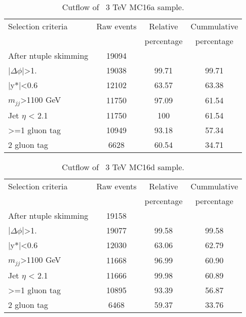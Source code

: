 \begin{table}[ht]
\begin{center}
\begin{tabular}{|l|c|c|c|}
\hline
Selection criteria & Raw events &  Relative & Cummulative \\
 & & percentage & percentage \\
\hline
After ntuple skimming & 19094 &  &  \\
$|\Delta\phi|$>1. & 19038 & 99.71 & 99.71 \\
|y*|<0.6 & 12102 & 63.57 & 63.38 \\
$m_{jj}$>1100 GeV & 11750 & 97.09 & 61.54 \\
Jet $\eta$ < 2.1 & 11750 & 100 & 61.54 \\
>=1 gluon tag & 10949 & 93.18 & 57.34 \\
2 gluon tag & 6628 & 60.54 & 34.71 \\
\hline
\end{tabular}
\end{center}
\caption{Cutflow of \Hprime\ 3 TeV MC16a sample.}
\end{table}

\begin{table}[ht]
\begin{center}
\begin{tabular}{|l|c|c|c|}
\hline
Selection criteria & Raw events &  Relative & Cummulative \\
 & & percentage & percentage \\
\hline
After ntuple skimming & 19158 &  &  \\
$|\Delta\phi|$>1. & 19077 & 99.58 & 99.58 \\
|y*|<0.6 & 12030 & 63.06 & 62.79 \\
$m_{jj}$>1100 GeV & 11668 & 96.99 & 60.90 \\
Jet $\eta$ < 2.1 & 11666 & 99.98 & 60.89 \\
>=1 gluon tag & 10895 & 93.39 & 56.87 \\
2 gluon tag & 6468 & 59.37 & 33.76 \\
\hline
\end{tabular}
\end{center}
\caption{Cutflow of \Hprime\ 3 TeV MC16d sample.}
\end{table}

